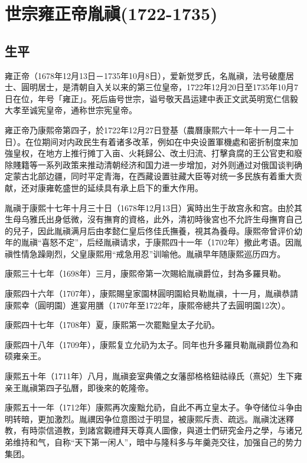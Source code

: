 
\section{世宗雍正帝胤禛\tiny(1722-1735)}

\subsection{生平}

雍正帝（1678年12月13日－1735年10月8日），爱新觉罗氏，名胤禛，法号破塵居士、圓明居士，是清朝自入关以来的第三位皇帝，1722年12月20日至1735年10月7日在位，年号「雍正」。死后庙号世宗，谥号敬天昌运建中表正文武英明宽仁信毅大孝至诚宪皇帝，通称世宗宪皇帝。

雍正帝乃康熙帝第四子，於1722年12月27日登基（農曆康熙六十一年十一月二十日）。在位期间对内政民生有着诸多改革，例如在中央设置軍機處和密折制度来加強皇权，在地方上推行摊丁入亩、火耗歸公、改土归流、打擊貪腐的王公官吏和廢除賤籍等一系列政策来推动清朝经济和国力进一步增加，对外则通过对俄国谈判确定蒙古北部边疆，同时平定青海，在西藏设置驻藏大臣等对统一多民族有着重大贡献，还对康雍乾盛世的延续具有承上启下的重大作用。

胤禛于康熙十七年十月三十日（1678年12月13日）寅時出生于故宫永和宫。由於其生母乌雅氏出身低微，沒有撫育的資格，此外，清初時後宮也不允許生母撫育自己的兒子，因此胤禛满月后由孝懿仁皇后佟佳氏撫養，視其為養母。康熙帝曾评价幼年的胤禛“喜怒不定”，后经胤禛请求，于康熙四十一年（1702年）撤此考语。因胤禛性情急躁剛烈，父皇康熙用“戒急用忍”训喻他。胤禛早年随康熙巡历四方。

康熙三十七年（1698年）三月，康熙帝第一次賜給胤禛爵位，封為多羅貝勒。

康熙四十六年（1707年），康熙賜皇家園林圓明園給貝勒胤禛，十一月，胤禛恭請康熙幸（圓明園）進宴用膳（1707年至1722年，康熙帝總共了去圓明園12次）。

康熙四十七年（1708年）夏，康熙第一次罷黜皇太子允礽。

康熙四十八年（1709年），康熙复立允礽为太子。同年也升多羅貝勒胤禛爵位為和硕雍亲王。

康熙五十年（1711年）八月，胤禛妾室典儀之女藩邸格格鈕祜祿氏（熹妃）生下雍亲王胤禛第四子弘曆，即後來的乾隆帝。

康熙五十一年（1712年）康熙再次废黜允礽，自此不再立皇太子。争夺储位斗争由明转暗，更加激烈。胤禩因争位意图过于明显，被康熙斥责、疏远。胤禛沈迷釋教，有時崇信道教，到諸宮觀禮拜天尊真人圖像，與道士們研究金丹之學，与诸兄弟维持和气，自称“天下第一闲人”，暗中与隆科多与年羹尧交往，加强自己的势力集团。


